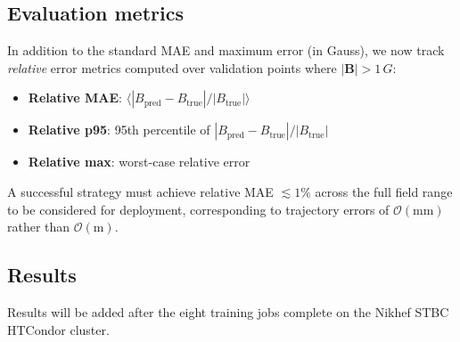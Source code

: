 \documentclass[11pt,a4paper]{article}
\newcommand{\SI}[2]{#1\,#2}
\begin{document}
\subsection{Evaluation metrics}

In addition to the standard MAE and maximum error (in Gauss), we now
track \emph{relative} error metrics computed over validation points
where $|\mathbf{B}| > \SI{1}{G}$:
\begin{itemize}
    \item \textbf{Relative MAE}: $\langle |B_{\text{pred}} - B_{\text{true}}| / |B_{\text{true}}| \rangle$
    \item \textbf{Relative p95}: 95th percentile of $|B_{\text{pred}} - B_{\text{true}}| / |B_{\text{true}}|$
    \item \textbf{Relative max}: worst-case relative error
\end{itemize}
A successful strategy must achieve relative MAE $\lesssim 1\%$ across
the full field range to be considered for deployment, corresponding to
trajectory errors of $\mathcal{O}(\text{mm})$ rather than
$\mathcal{O}(\text{m})$.

\subsection{Results}

Results will be added after the eight training jobs complete on the
Nikhef STBC HTCondor cluster.


\end{document}
